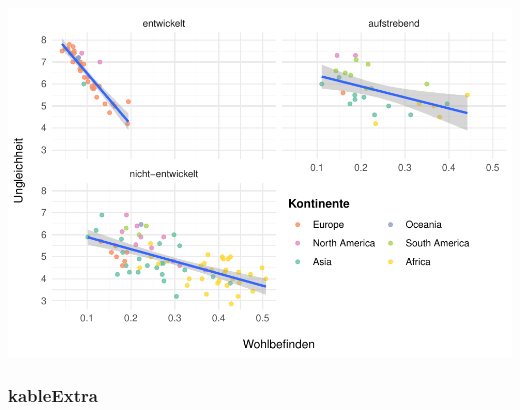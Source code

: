 \documentclass[
  twocolumn]{article}
\begin{document}
\includegraphics{PDFoutputsamples_files/figure-latex/unnamed-chunk-6-1.pdf}

\newpage

\hypertarget{kableextra}{%
\subsubsection{kableExtra}\label{kableextra}}
\end{document}
